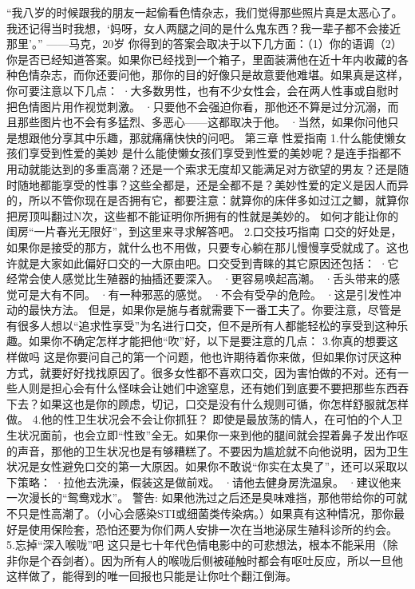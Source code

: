 \documentclass[12pt,UTF8]{ctexbook}
\begin{document}
“我八岁的时候跟我的朋友一起偷看色情杂志，我们觉得那些照片真是太恶心了。我还记得当时我想，‘妈呀，女人两腿之间的是什么鬼东西？我一辈子都不会接近那里’。”
——马克，20岁
你得到的答案会取决于以下几方面：（1）你的语调（2）你是否已经知道答案。如果你已经找到一个箱子，里面装满他在近十年内收藏的各种色情杂志，而你还要问他，那你的目的好像只是故意要他难堪。如果真是这样，你可要注意以下几点：
·大多数男性，也有不少女性会，会在两人性事或自慰时把色情图片用作视觉刺激。
·只要他不会强迫你看，那他还不算是过分沉溺，而且那些图片也不会有多猛烈、多恶心——这都取决于他。
·当然，如果你问他只是想跟他分享其中乐趣，那就痛痛快快的问吧。
第三章 性爱指南
1.什么能使懒女孩们享受到性爱的美妙
是什么能使懒女孩们享受到性爱的美妙呢？是连手指都不用动就能达到的多重高潮？还是一个索求无度却又能满足对方欲望的男友？还是随时随地都能享受的性事？这些全都是，还是全都不是？美妙性爱的定义是因人而异的，所以不管你现在是否拥有它，都要注意：就算你的床伴多如过江之鲫，就算你把房顶叫翻过N次，这些都不能证明你所拥有的性就是美妙的。
如何才能让你的闺房“一片春光无限好”，到这里来寻求解答吧。
2.口交技巧指南
口交的好处是，如果你是接受的那方，就什么也不用做，只要专心躺在那儿慢慢享受就成了。这也许就是大家如此偏好口交的一大原由吧。口交受到青睐的其它原因还包括：
·它经常会使人感觉比生殖器的抽插还要深入。
·更容易唤起高潮。
·舌头带来的感觉可是大有不同。
·有一种邪恶的感觉。
·不会有受孕的危险。
·这是引发性冲动的最快方法。
但是，如果你是施与者就需要下一番工夫了。你要注意，尽管是有很多人想以“追求性享受”为名进行口交，但不是所有人都能轻松的享受到这种乐趣。如果你不确定怎样才能把他“吹”好，以下是要注意的几点：
3.你真的想要这样做吗
这是你要问自己的第一个问题，他也许期待着你来做，但如果你讨厌这种方式，就要好好找找原因了。很多女性都不喜欢口交，因为害怕做的不对。还有一些人则是担心会有什么怪味会让她们中途窒息，还有她们到底要不要把那些东西吞下去？如果这也是你的顾虑，切记，口交是没有什么规则可循，你怎样舒服就怎样做。
4.他的性卫生状况会不会让你抓狂？
即使是最放荡的情人，在可怕的个人卫生状况面前，也会立即“性致”全无。如果你一来到他的腿间就会捏着鼻子发出作呕的声音，那他的卫生状况也是有够糟糕了。不要因为尴尬就不向他说明，因为卫生状况是女性避免口交的第一大原因。如果你不敢说“你实在太臭了”，还可以采取以下策略：
·拉他去洗澡，假装这是做前戏。
·请他去健身房洗温泉。
·建议他来一次漫长的“鸳鸯戏水”。
警告:
如果他洗过之后还是臭味难挡，那他带给你的可就不只是性高潮了。（小心会感染STI或细菌类传染病。）如果真有这种情况，那你最好是使用保险套，恐怕还要为你们两人安排一次在当地泌尿生殖科诊所的约会。
5.忘掉“深入喉咙”吧
这只是七十年代色情电影中的可悲想法，根本不能采用（除非你是个吞剑者）。因为所有人的喉咙后侧被碰触时都会有呕吐反应，所以一旦他这样做了，能得到的唯一回报也只能是让你吐个翻江倒海。
\end{document}
